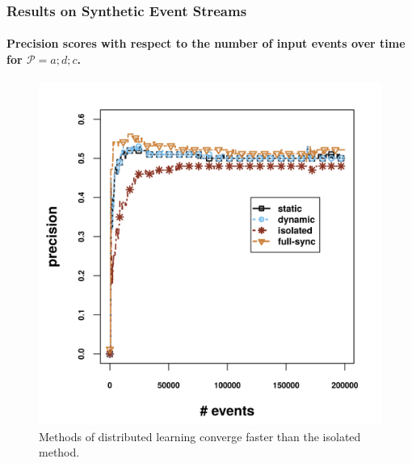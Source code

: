\begin{frame}
	
	\frametitle{Results on Synthetic Event Streams }
	\framesubtitle{Precision scores with respect to the number of input events over time for $\mathcal{P}=a;d;c$.}
	
	\begin{figure}[H]
		\centering
		\includegraphics[width=.7\textwidth,height=.6\textheight]{../chapters/figures/synthetic/new/precision_synthetic.png}\linebreak\\
		Methods of distributed learning converge faster than the isolated method.
		
	\end{figure}
	
\end{frame}


